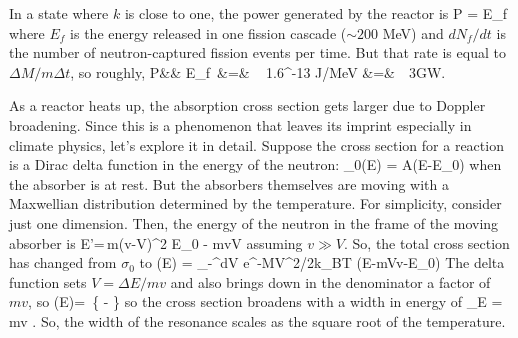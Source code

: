 \documentclass[11pt]{book}
\begin{document}
%
%


In a state where $k$ is close to one, the power generated by the reactor is
\be
P = E_f 
\ee
where $E_f$ is the energy released in one fission cascade ($\sim200$ MeV) and $dN_f/dt$ is the number of neutron-captured fission events per time. But that rate is equal to $\Delta M/m\Delta t$, so roughly,
\bea
P&\simeq & E_f\, \vs
&=&
\,\, \,1.6^{-13} J/MeV
\vs
&=&
\,\, 3GW.
\eea


As a reactor heats up, the absorption cross section gets larger due to Doppler broadening. Since this is a phenomenon that leaves its imprint especially in climate physics, let's explore it in detail. Suppose the cross section for a reaction is a Dirac delta function in the energy of the neutron:
\be
\sigma_0(E) = A\delta(E-E_0)
\ee
when the absorber is at rest. But the absorbers themselves are moving with a Maxwellian distribution determined by the temperature. For simplicity, consider just one dimension. Then, the energy of the neutron in the frame of the moving absorber is 
\be
E'=\,m(v-V)^2 \simeq E_0 - mvV
\ee
assuming $v\gg V$. So, the total cross section has changed from
$\sigma_0 $
to
\be
\sigma(E) =  \int_{-\infty}^\infty dV e^{-MV^2/2k_BT} \delta(E-mVv-E_0)
\ee
The delta function sets $V=\Delta E/mv$ and also brings down in the denominator a factor of $mv$, so
\be
\sigma(E)=  \,\exp\left\{ - \right\}
\ee
so the cross section broadens with a width in energy of \be
\sigma_E = mv .\ee
So, the width of the resonance scales as the square root of the temperature.
\end{document}
